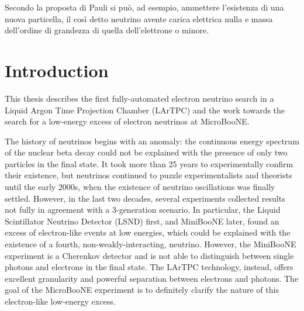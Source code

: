 \begin{savequote}[8cm]
 Secondo la proposta di Pauli si può, ad esempio, ammettere l'esistenza di una nuova particella, il così detto neutrino avente carica elettrica nulla e massa dell'ordine di grandezza di quella dell'elettrone o minore.
\end{savequote}

\chapter{\label{ch:1-intro}Introduction} 

This thesis describes the first fully-automated electron neutrino search in a Liquid Argon Time Projection Chamber (LArTPC) and the work towards the search for a low-energy excess of electron neutrinos at MicroBooNE.

The history of neutrinos begins with an anomaly: the continuous energy spectrum of the nuclear beta decay could not be explained with the presence of only two particles in the final state. It took more than 25 years to experimentally confirm their existence, but neutrinos continued to puzzle experimentalists and theorists until the early 2000s, when the existence of neutrino oscillations was finally settled. 
However, in the last two decades, several experiments collected results not fully in agreement with a 3-generation scenario.
In particular, the Liquid Scintillator Neutrino Detector (LSND) first, and MiniBooNE later, found an excess of electron-like events at low energies, which could be explained with the existence of a fourth, non-weakly-interacting, neutrino. However, the MiniBooNE experiment is a Cherenkov detector and is not able to distinguish between single photons and electrons in the final state. The LArTPC technology, instead, offers excellent granularity and powerful separation between electrons and photons. The goal of the MicroBooNE experiment is to definitely clarify the nature of this electron-like low-energy excess.

